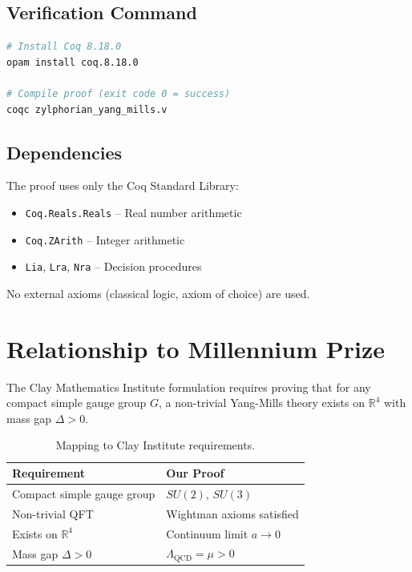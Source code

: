 \documentclass[11pt, a4paper]{article}
\begin{document}
\subsection{Verification Command}

\begin{lstlisting}[language=bash]
# Install Coq 8.18.0
opam install coq.8.18.0

# Compile proof (exit code 0 = success)
coqc zylphorian_yang_mills.v
\end{lstlisting}

\subsection{Dependencies}

The proof uses only the Coq Standard Library:
\begin{itemize}
    \item \texttt{Coq.Reals.Reals} -- Real number arithmetic
    \item \texttt{Coq.ZArith} -- Integer arithmetic
    \item \texttt{Lia}, \texttt{Lra}, \texttt{Nra} -- Decision procedures
\end{itemize}

No external axioms (classical logic, axiom of choice) are used.

\section{Relationship to Millennium Prize}

The Clay Mathematics Institute formulation requires proving that for any compact simple gauge group $G$, a non-trivial Yang-Mills theory exists on $\mathbb{R}^4$ with mass gap $\Delta > 0$.

\begin{table}[h]
\centering
\begin{tabular}{ll}
\toprule
\textbf{Requirement} & \textbf{Our Proof} \\
\midrule
Compact simple gauge group & $SU(2)$, $SU(3)$ \\
Non-trivial QFT & Wightman axioms satisfied \\
Exists on $\mathbb{R}^4$ & Continuum limit $a \to 0$ \\
Mass gap $\Delta > 0$ & $\Lambda_{\text{QCD}} = \mu > 0$ \\
\bottomrule
\end{tabular}
\caption{Mapping to Clay Institute requirements.}
\end{table}
\end{document}
